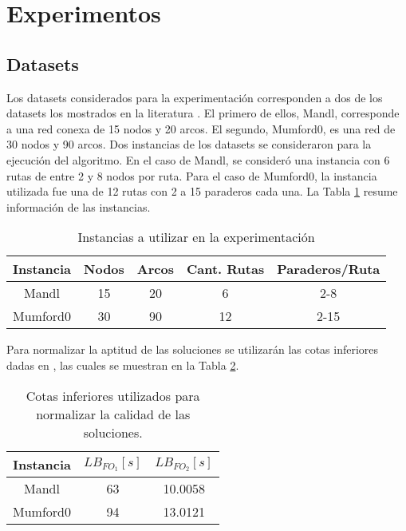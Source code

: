 \section{Experimentos}

\subsection{Datasets}

Los datasets considerados para la experimentación corresponden a dos de los datasets los mostrados en la literatura \cite{NewHaEOps}. El primero de ellos, Mandl, corresponde a una red conexa de 15 nodos y 20 arcos. El segundo, Mumford0, es una red de 30 nodos y 90 arcos.  Dos instancias de los datasets se consideraron para la ejecución del algoritmo. En el caso de Mandl, se consideró una instancia con 6 rutas de entre 2 y 8 nodos por ruta. Para el caso de Mumford0, la instancia utilizada fue una de 12 rutas con 2 a 15 paraderos cada una. La Tabla \ref{tab:instancias} resume información de las instancias. 

\begin{table}[!htb]
\begin{center}
\begin{tabular}{|c|c|c|c|c|}
\hline
Instancia & Nodos & Arcos & Cant. Rutas & Paraderos/Ruta \\
\hline
\hline
Mandl & 15 & 20 & 6 & 2-8 \\
Mumford0 & 30 & 90 & 12 & 2-15\\
\hline
\end{tabular}
\end{center}
\caption{Instancias a utilizar en la experimentación}
\label{tab:instancias}
\end{table}

Para normalizar la aptitud de las soluciones se utilizarán las cotas inferiores dadas en \cite{NewHaEOps}, las cuales se muestran en la Tabla \ref{tab:norm}.

\begin{table}[!htb]
\begin{center}
\begin{tabular}{|c|c|c|}
\hline
Instancia & $LB_{FO_1} [s]$ & $LB_{FO_2} [s]$\\
\hline
\hline
Mandl & 63 & 10.0058\\
Mumford0 & 94 & 13.0121\\
\hline
\end{tabular}
\end{center}
\caption{Cotas inferiores utilizados para normalizar la calidad de las soluciones.}
\label{tab:norm}
\end{table}

